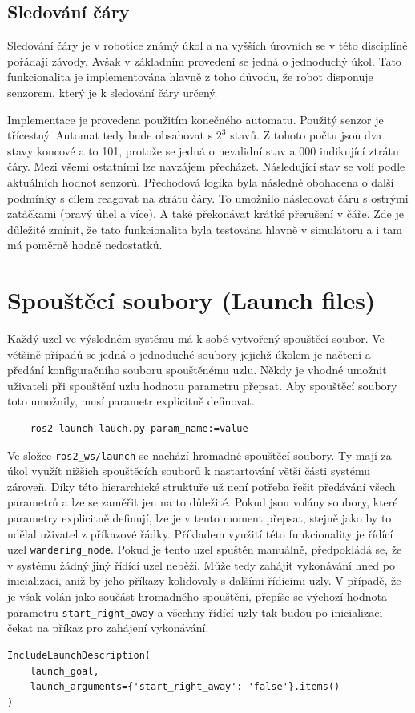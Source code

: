 \subsection*{Sledování čáry}
Sledování čáry je v robotice známý úkol a na vyšších úrovních se v této disciplíně pořádají závody. Avšak v základním provedení se jedná o jednoduchý úkol. Tato funkcionalita je implementována hlavně z toho důvodu, že robot disponuje senzorem, který je k sledování čáry určený.

Implementace je provedena použitím konečného automatu. Použitý senzor je třícestný. Automat tedy bude obsahovat s $2^3$ stavů. Z tohoto počtu jsou dva stavy koncové a to 101, protože se jedná o nevalidní stav a 000 indikující ztrátu čáry. Mezi všemi ostatními lze navzájem přecházet. Následující stav se volí podle aktuálních hodnot senzorů. Přechodová logika byla následně obohacena o další podmínky s cílem reagovat na ztrátu čáry. To umožnilo následovat čáru s ostrými zatáčkami (pravý úhel a více). A také překonávat krátké přerušení v čáře. Zde je důležité zmínit, že tato funkcionalita byla testována hlavně v simulátoru a i tam má poměrně hodně nedostatků. 

\section{Spouštěcí soubory (Launch files)}
Každý uzel ve výsledném systému má k sobě vytvořený spouštěcí soubor. Ve většině případů se jedná o jednoduché soubory jejichž úkolem je načtení a předání konfiguračního souboru spouštěnému uzlu. Někdy je vhodné umožnit uživateli při spouštění uzlu hodnotu parametru přepsat. Aby spouštěcí soubory toto umožnily, musí parametr explicitně definovat.
\begin{verbatim}
	ros2 launch lauch.py param_name:=value
\end{verbatim}
Ve složce \verb|ros2_ws/launch| se nachází hromadné spouštěcí soubory. Ty mají za úkol využít nižších spouštěcích souborů k nastartování větší části systému zároveň. Díky této hierarchické struktuře už není potřeba řešit předávání všech parametrů a lze se zaměřit jen na to důležité. Pokud jsou volány soubory, které parametry explicitně definují, lze je v tento moment přepsat, stejně jako by to udělal uživatel z příkazové řádky. Příkladem využití této funkcionality je řídící uzel \verb|wandering_node|. Pokud je tento uzel spuštěn manuálně, předpokládá se, že v systému žádný jiný řídící uzel neběží. Může tedy zahájit vykonávání hned po inicializaci, aniž by jeho příkazy kolidovaly s dalšími řídícími uzly. V případě, že je však volán jako součást hromadného spouštění, přepíše se výchozí hodnota parametru \verb|start_right_away| a všechny řídící uzly tak budou po inicializaci čekat na příkaz pro zahájení vykonávání.
\begin{verbatim}
IncludeLaunchDescription(
    launch_goal,
    launch_arguments={'start_right_away': 'false'}.items()
)
\end{verbatim}

